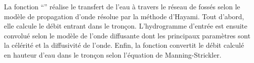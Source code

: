 La fonction ``\frenchname'' réalise le transfert de l'eau à travers le réseau de fossés selon le modèle de propagation d'onde résolue par la méthode d'Hayami. Tout d'abord, elle calcule le débit entrant dans le tronçon. L'hydrogramme d'entrée est ensuite convolué selon le modèle de l'onde diffusante dont les principaux paramètres sont la célérité et la diffusivité de l'onde. Enfin, la fonction convertit le débit calculé en hauteur d'eau dans le tronçon selon l'équation de Manning-Strickler.